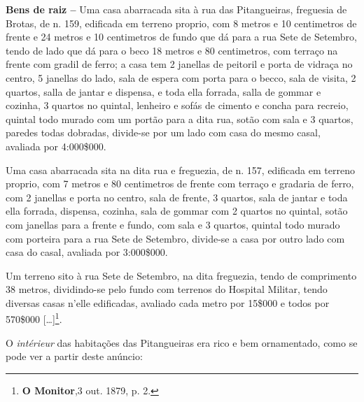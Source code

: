 \begin{citacao}
\textbf{Bens de raiz -- }Uma casa abarracada sita à rua das Pitangueiras, freguesia de Brotas, de n. 159, edificada em terreno proprio, com 8 metros e 10 centimetros de frente e 24 metros e 10 centimetros de fundo que dá para a rua Sete de Setembro, tendo de lado que dá para o beco 18 metros e 80 centimetros, com terraço na frente com gradil de ferro; a casa tem 2 janellas de peitoril e porta de vidraça no centro, 5 janellas do lado, sala de espera com porta para o becco, sala de visita, 2 quartos, salla de jantar e dispensa, e toda ella forrada, salla de gommar e cozinha, 3 quartos no quintal, lenheiro e sofás de cimento e concha para recreio, quintal todo murado com um portão para a dita rua, sotão com sala e 3 quartos, paredes todas dobradas, divide-se por um lado com casa do mesmo casal, avaliada por 4:000\$000.

Uma casa abarracada sita na dita rua e freguezia, de n. 157, edificada em terreno proprio, com 7 metros e 80 centimetros de frente com terraço e gradaria de ferro, com 2 janellas e porta no centro, sala de frente, 3 quartos, sala de jantar e toda ella forrada, dispensa, cozinha, sala de gommar com 2 quartos no quintal, sotão com janellas para a frente e fundo, com sala e 3 quartos, quintal todo murado com porteira para a rua Sete de Setembro, divide-se a casa por outro lado com casa do casal, avaliada por 3:000\$000.

Um terreno sito à rua Sete de Setembro, na dita freguezia, tendo de comprimento 38 metros, dividindo-se pelo fundo com terrenos do Hospital Militar, tendo diversas casas n'elle edificadas, avaliado cada metro por 15\$000 e todos por 570\$000 [\dots]\footnote{\textbf{O Monitor},3 out. 1879, p. 2.}.
\end{citacao}

O \textit{intérieur} das habitações das Pitangueiras era rico e bem ornamentado, como se pode ver a partir deste anúncio:

